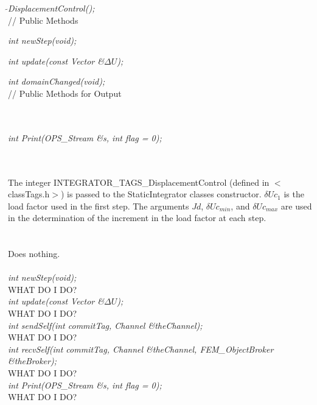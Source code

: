 {\em $\tilde{ }$DisplacementControl();}\\  

// Public Methods 

{\em int newStep(void);} 

{\em int update(const Vector \&$\Delta U$);} 

{\em int domainChanged(void);} \\ 

// Public Methods for Output

\\ 
\\ 
{\em int Print(OPS_Stream \&s, int flag = 0);}


 \\
\\ 
The integer INTEGRATOR\_TAGS\_DisplacementControl (defined in
$<$classTags.h$>$) is passed to the StaticIntegrator classes
constructor. $\delta Uc_1$ is the load factor used in the first
step. The arguments $Jd$, $\delta Uc_{min}$, and $\delta
Uc_{max}$ are used in the determination of the increment in the
load factor at each step. \\



 \\
\\ 
Does nothing. \\

\\

{\em int newStep(void);} \\
WHAT DO I DO?\\

{\em int update(const Vector \&$\Delta U$);} \\
WHAT DO I DO?\\

{\em int sendSelf(int commitTag, Channel \&theChannel); } \\ 
WHAT DO I DO?\\

{\em int recvSelf(int commitTag, Channel \&theChannel, 
FEM\_ObjectBroker \&theBroker); } \\ 
WHAT DO I DO?\\

{\em int Print(OPS_Stream \&s, int flag = 0);}\\
WHAT DO I DO?